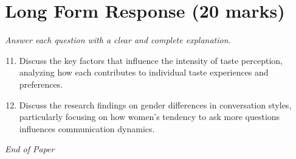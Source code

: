 \documentclass[12pt]{article}
\begin{document}
\section*{Long Form Response (20 marks)}
\textit{Answer each question with a clear and complete explanation.}
\begin{enumerate}[label=\arabic*.]
\setcounter{enumi}{10}
\item Discuss the key factors that influence the intensity of taste perception, analyzing how each contributes to individual taste experiences and preferences.
\item Discuss the research findings on gender differences in conversation styles, particularly focusing on how women's tendency to ask more questions influences communication dynamics.
\end{enumerate}

\vfill
\noindent\textit{End of Paper}
\end{document}
